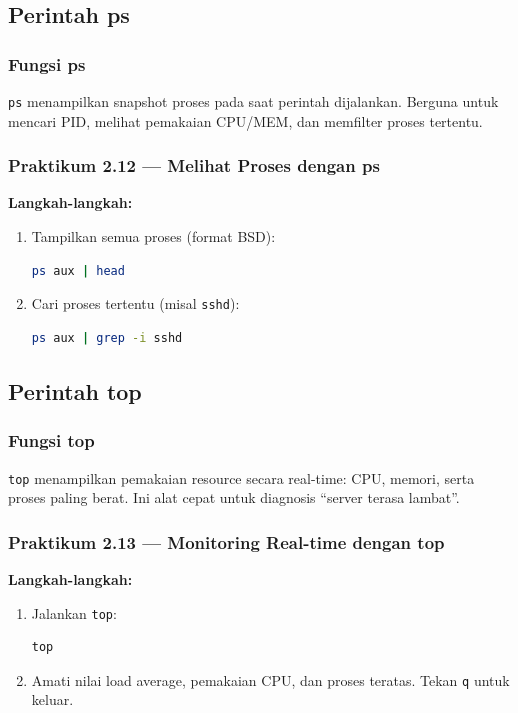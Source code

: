 \subsection{Perintah ps}
\subsubsection*{Fungsi ps}
\texttt{ps} menampilkan snapshot proses pada saat perintah dijalankan. Berguna untuk mencari PID, melihat pemakaian CPU/MEM, dan memfilter proses tertentu.

\subsubsection*{Praktikum 2.12 --- Melihat Proses dengan ps}
\textbf{Langkah-langkah:}
\begin{enumerate}
    \item Tampilkan semua proses (format BSD):
\begin{lstlisting}[language=bash, caption={ps aux}]
ps aux | head
\end{lstlisting}

    \item Cari proses tertentu (misal \texttt{sshd}):
\begin{lstlisting}[language=bash, caption={Filter proses dengan grep}]
ps aux | grep -i sshd
\end{lstlisting}
\end{enumerate}

\subsection{Perintah top}
\subsubsection*{Fungsi top}
\texttt{top} menampilkan pemakaian resource secara real-time: CPU, memori, serta proses paling berat.
Ini alat cepat untuk diagnosis ``server terasa lambat''.

\subsubsection*{Praktikum 2.13 --- Monitoring Real-time dengan top}
\textbf{Langkah-langkah:}
\begin{enumerate}
    \item Jalankan \texttt{top}:
\begin{lstlisting}[language=bash, caption={Menjalankan top}]
top
\end{lstlisting}

    \item Amati nilai load average, pemakaian CPU, dan proses teratas. Tekan \texttt{q} untuk keluar.
\end{enumerate}

